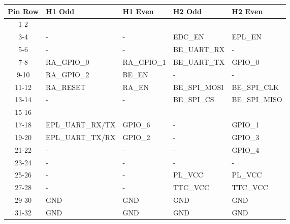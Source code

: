 \begin{table}[!ht]
    \centering
    \begin{tabular}{cllll}
        \toprule[1.5pt]
        \textbf{Pin Row}   & \textbf{H1 Odd}  & \textbf{H1 Even} & \textbf{H2 Odd} & \textbf{H2 Even} \\
        \midrule
        1-2                & -                & -                & -               & -                \\
        3-4                & -                & -                & EDC\_EN         & EPL\_EN          \\
        5-6                & -                & -                & BE\_UART\_RX    & -                \\
        7-8                & RA\_GPIO\_0      & RA\_GPIO\_1      & BE\_UART\_TX    & GPIO\_0          \\
        9-10               & RA\_GPIO\_2      & BE\_EN           & -               & -                \\
        11-12              & RA\_RESET        & RA\_EN           & BE\_SPI\_MOSI   & BE\_SPI\_CLK     \\
        13-14              & -                & -                & BE\_SPI\_CS     & BE\_SPI\_MISO    \\
        15-16              & -                & -                & -               & -                \\
        17-18              & EPL\_UART\_RX/TX & GPIO\_6          & -               & GPIO\_1          \\
        19-20              & EPL\_UART\_TX/RX & GPIO\_2          & -               & GPIO\_3          \\
        21-22              & -                & -                & -               & GPIO\_4          \\
        23-24              & -                & -                & -               & -                \\
        25-26              & -                & -                & PL\_VCC         & PL\_VCC          \\
        27-28              & -                & -                & TTC\_VCC        & TTC\_VCC         \\
        29-30              & GND              & GND              & GND             & GND              \\
        31-32              & GND              & GND              & GND             & GND              \\

\end{tabular}
\end{table}
